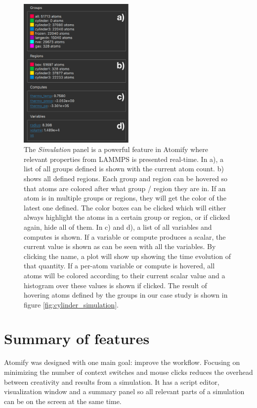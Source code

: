 \documentclass[12pt,a4paper,final]{iopart}
\begin{document}
\begin{figure}[htp!]
	\centering
	\includegraphics[width=0.5\textwidth]{figures/rightbar.pdf}
	\caption{
		The \textit{Simulation} panel is a powerful feature in Atomify where relevant
		properties from LAMMPS is presented real-time.
		In a), a list of all groups defined is shown with the current atom count.
		b) shows all defined regions. Each group and region can be hovered so that atoms
		are colored after what group / region they are in. If an atom is in multiple
		groups or regions, they will get the color of the latest one defined.
		The color boxes can be clicked which will either always highlight the atoms in a certain group or region,
		or if clicked again, hide all of them.
		In c) and d), a list of all variables and computes is shown. If a variable or compute
		produces a scalar, the current value is shown as can be seen with all the variables.
		By clicking the name, a plot will show up showing the time evolution of that quantity.
		If a per-atom variable or compute is hovered, all atoms will be colored according to their
		current scalar value and a histogram over these values is shown if clicked.
		The result of hovering atoms defined by the groups in our case study is shown in figure \ref{fig:cylinder_simulation}.
    }
	\label{fig:rightbar}
\end{figure}

\section{\label{sec:features}Summary of features}
Atomify was designed with one main goal: improve the workflow.
Focusing on minimizing the number of context switches and mouse clicks reduces
the overhead between creativity and results from a simulation.
It has a script editor, visualization window and a summary panel so all relevant parts
of a simulation can be on the screen at the same time.
\end{document}
